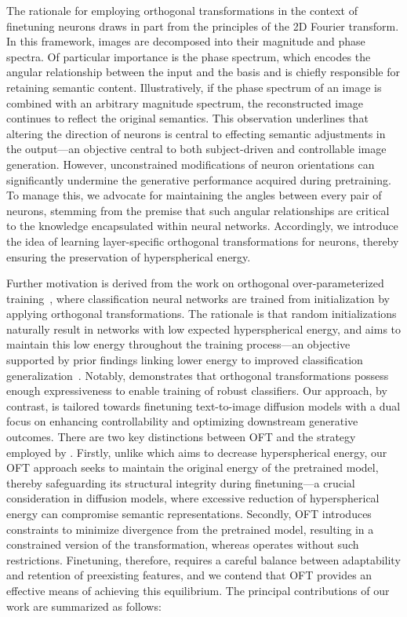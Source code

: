The rationale for employing orthogonal transformations in the context of finetuning neurons draws in part from the principles of the 2D Fourier transform. In this framework, images are decomposed into their magnitude and phase spectra. Of particular importance is the phase spectrum, which encodes the angular relationship between the input and the basis and is chiefly responsible for retaining semantic content. Illustratively, if the phase spectrum of an image is combined with an arbitrary magnitude spectrum, the reconstructed image continues to reflect the original semantics. This observation underlines that altering the direction of neurons is central to effecting semantic adjustments in the output—an objective central to both subject-driven and controllable image generation. However, unconstrained modifications of neuron orientations can significantly undermine the generative performance acquired during pretraining. To manage this, we advocate for maintaining the angles between every pair of neurons, stemming from the premise that such angular relationships are critical to the knowledge encapsulated within neural networks. Accordingly, we introduce the idea of learning layer-specific orthogonal transformations for neurons, thereby ensuring the preservation of hyperspherical energy.

Further motivation is derived from the work on orthogonal over-parameterized training~\cite{liu2021orthogonal}, where classification neural networks are trained from initialization by applying orthogonal transformations. The rationale is that random initializations naturally result in networks with low expected hyperspherical energy, and \cite{liu2021orthogonal} aims to maintain this low energy throughout the training process—an objective supported by prior findings linking lower energy to improved classification generalization~\cite{liu2018learning,lin2020regularizing}. Notably, \cite{liu2021orthogonal} demonstrates that orthogonal transformations possess enough expressiveness to enable training of robust classifiers. Our approach, by contrast, is tailored towards finetuning text-to-image diffusion models with a dual focus on enhancing controllability and optimizing downstream generative outcomes. There are two key distinctions between OFT and the strategy employed by \cite{liu2021orthogonal}. Firstly, unlike \cite{liu2021orthogonal} which aims to decrease hyperspherical energy, our OFT approach seeks to maintain the original energy of the pretrained model, thereby safeguarding its structural integrity during finetuning—a crucial consideration in diffusion models, where excessive reduction of hyperspherical energy can compromise semantic representations. Secondly, OFT introduces constraints to minimize divergence from the pretrained model, resulting in a constrained version of the transformation, whereas \cite{liu2021orthogonal} operates without such restrictions. Finetuning, therefore, requires a careful balance between adaptability and retention of preexisting features, and we contend that OFT provides an effective means of achieving this equilibrium. The principal contributions of our work are summarized as follows:

